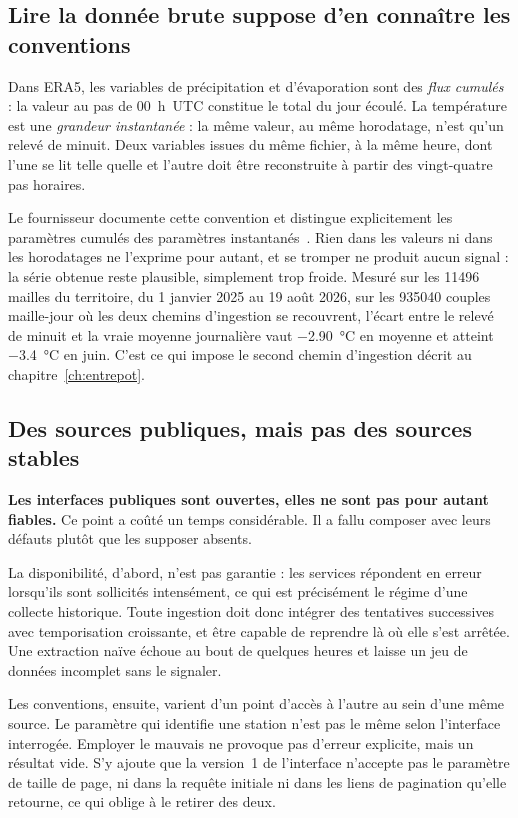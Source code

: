 \subsection{Lire la donnée brute suppose d'en connaître les conventions}

Dans ERA5, les variables de précipitation et d'évaporation sont des \emph{flux cumulés} : la
valeur au pas de 00~h~UTC constitue le total du jour écoulé. La température est une
\emph{grandeur instantanée} : la même valeur, au même horodatage, n'est qu'un relevé de minuit.
Deux variables issues du même fichier, à la même heure, dont l'une se lit telle quelle et
l'autre doit être reconstruite à partir des vingt-quatre pas horaires.

Le fournisseur documente cette convention et distingue explicitement les paramètres cumulés des
paramètres instantanés~\cite{munozsabater2021era5land}. Rien dans les valeurs ni dans les
horodatages ne l'exprime pour autant, et se tromper ne produit aucun signal : la série obtenue
reste plausible, simplement trop froide. Mesuré sur les \num{11496} mailles du territoire, du
1\ier{} janvier 2025 au 19 août 2026, sur les \num{935040} couples maille-jour où les deux
chemins d'ingestion se recouvrent, l'écart entre le relevé de minuit et la vraie moyenne journalière vaut \SI{-2,90}{\celsius} en
moyenne et atteint \SI{-3,4}{\celsius} en juin. C'est ce qui impose le second chemin
d'ingestion décrit au chapitre~\ref{ch:entrepot}.

\subsection{Des sources publiques, mais pas des sources stables}

\textbf{Les interfaces publiques sont ouvertes, elles ne sont pas pour autant fiables.} Ce point
a coûté un temps considérable. Il a fallu composer avec leurs défauts plutôt que les supposer
absents.

La disponibilité, d'abord, n'est pas garantie : les services répondent en erreur lorsqu'ils
sont sollicités intensément, ce qui est précisément le régime d'une collecte historique. Toute
ingestion doit donc intégrer des tentatives successives avec temporisation croissante, et être
capable de reprendre là où elle s'est arrêtée. Une extraction naïve échoue au bout de quelques
heures et laisse un jeu de données incomplet sans le signaler.

Les conventions, ensuite, varient d'un point d'accès à l'autre au sein d'une même source. Le
paramètre qui identifie une station n'est pas le même selon l'interface interrogée. Employer
le mauvais ne provoque pas d'erreur explicite, mais un résultat vide. S'y ajoute que la version~1 de l'interface n'accepte pas le paramètre de taille de
page, ni dans la requête initiale ni dans les liens de pagination qu'elle retourne, ce qui
oblige à le retirer des deux.

